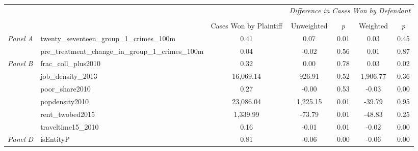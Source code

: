 \begin{tabular}{llccccc}
\toprule
 &  & \textit{} & \multicolumn{4}{c}{\textit{Difference in Cases Won by Defendant}} \\
\cline{4-7}
\\
 &  & Cases Won by Plaintiff & Unweighted & \emph{p} & Weighted & \emph{p} \\
\midrule
\multirow[c]{2}{3cm}{\textit{Panel A}} & twenty_seventeen_group_1_crimes_100m & 0.41 & 0.07 & 0.01 & 0.03 & 0.45 \\
 & pre_treatment_change_in_group_1_crimes_100m & 0.04 & -0.02 & 0.56 & 0.01 & 0.87 \\
\cline{1-7}
\multirow[c]{6}{3cm}{\textit{Panel B}} & frac_coll_plus2010 & 0.32 & 0.00 & 0.78 & 0.03 & 0.02 \\
 & job_density_2013 & 16,069.14 & 926.91 & 0.52 & 1,906.77 & 0.36 \\
 & poor_share2010 & 0.27 & -0.00 & 0.53 & -0.03 & 0.00 \\
 & popdensity2010 & 23,086.04 & 1,225.15 & 0.01 & -39.79 & 0.95 \\
 & rent_twobed2015 & 1,339.99 & -73.79 & 0.01 & -48.83 & 0.25 \\
 & traveltime15_2010 & 0.16 & -0.01 & 0.01 & -0.02 & 0.00 \\
\cline{1-7}
\textit{Panel D} & isEntityP & 0.81 & -0.06 & 0.00 & -0.06 & 0.00 \\
\cline{1-7}
\bottomrule
\end{tabular}
